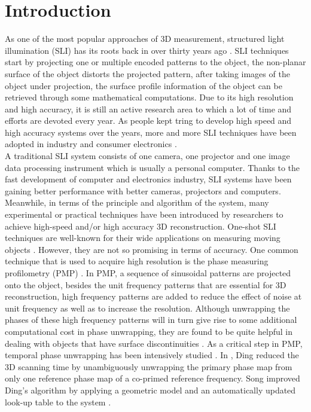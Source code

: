 \documentclass[10pt,letterpaper]{article}
\begin{document}
\section{Introduction}
As one of the most popular approaches of 3D measurement,  structured light illumination (SLI) has its roots back in over thirty years ago \cite {inde78, posd82, boyer87}. SLI techniques start by projecting one or multiple encoded patterns to the object, the non-planar surface of the object distorts the projected pattern, after taking images of the object under projection, the surface profile information of the object can be retrieved through some mathematical computations.  Due to its high resolution and high accuracy, it is still an active research area to which a lot of time and efforts are devoted every year. As people kept tring to develop high speed and high accuracy systems over the years, more and more SLI techniques have been adopted in industry and consumer electronics \cite{geng11}.\\
A traditional SLI system consists of one camera, one projector and one image data processing instrument which is usually a personal computer. Thanks to the fast development of computer and electronics industry, SLI systems have been gaining better performance with better cameras, projectors and computers. Meanwhile, in terms of the principle and algorithm of the system, many experimental or practical techniques have been introduced by researchers to achieve high-speed and/or high accuracy 3D reconstruction. One-shot SLI techniques are well-known for their wide applications on measuring moving objects \cite{deetjen17}. However, they are not so promising in terms of accuracy\cite{zhan12}. One common technique that is used to acquire high resolution is the phase measuring profilometry (PMP) \cite {srin85}. In PMP, a sequence of sinusoidal patterns are projected onto the object, besides the unit frequency patterns that are essential for 3D reconstruction,  high frequency patterns are added to reduce the effect of noise at unit frequency as well as to increase the resolution. Although unwrapping the phases of these high frequency patterns will in turn give rise to some additional computational cost in phase unwrapping, they are found to be quite helpful in dealing with objects that have surface discontinuities \cite{lieb05, siva10}. As a critical step in PMP, temporal phase unwrapping has been intensively studied \cite{zuo16}. In \cite{ding11}, Ding {\etal} reduced the 3D scanning time by unambiguously unwrapping the primary phase map from only one reference phase map of a co-primed reference frequency. Song {\etal} improved Ding's algorithm by  applying a geometric model and an automatically updated look-up table to the system \cite{song18}.\\
\end{document}
